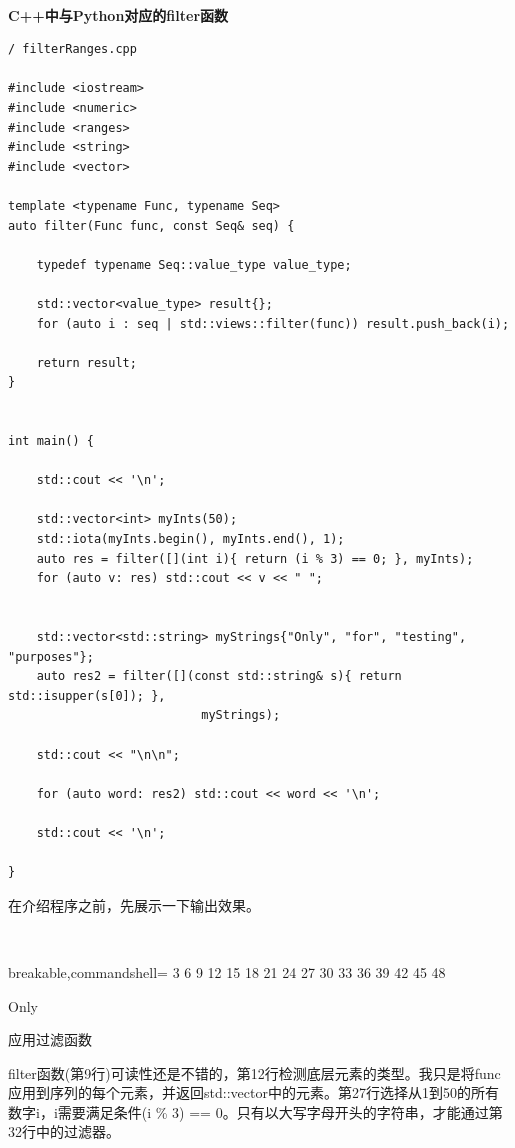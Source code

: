\hspace*{\fill} \\ %
\noindent
\textbf{C++中与Python对应的filter函数}
\begin{lstlisting}[style=styleCXX]
/ filterRanges.cpp

#include <iostream>
#include <numeric>
#include <ranges>
#include <string>
#include <vector>

template <typename Func, typename Seq>
auto filter(Func func, const Seq& seq) {

	typedef typename Seq::value_type value_type;
	
	std::vector<value_type> result{};
	for (auto i : seq | std::views::filter(func)) result.push_back(i);
	
	return result;
}


int main() {
	
	std::cout << '\n';
	
	std::vector<int> myInts(50);
	std::iota(myInts.begin(), myInts.end(), 1);
	auto res = filter([](int i){ return (i % 3) == 0; }, myInts);
	for (auto v: res) std::cout << v << " ";
	
	
	std::vector<std::string> myStrings{"Only", "for", "testing", "purposes"};
	auto res2 = filter([](const std::string& s){ return std::isupper(s[0]); },
	                       myStrings);
	
	std::cout << "\n\n";
	
	for (auto word: res2) std::cout << word << '\n';
	
	std::cout << '\n';

}
\end{lstlisting}

在介绍程序之前，先展示一下输出效果。

\hspace*{\fill} \\ %
\begin{tcblisting}{breakable,commandshell={}}
3 6 9 12 15 18 21 24 27 30 33 36 39 42 45 48

Only
\end{tcblisting}

\begin{center}
应用过滤函数
\end{center}

filter函数(第9行)可读性还是不错的，第12行检测底层元素的类型。我只是将func应用到序列的每个元素，并返回std::vector中的元素。第27行选择从1到50的所有数字i，i需要满足条件(i \% 3) == 0。只有以大写字母开头的字符串，才能通过第32行中的过滤器。

